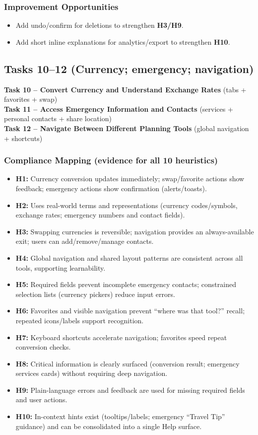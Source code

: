 \documentclass[11pt,a4paper]{article}
\begin{document}
\subsubsection{Improvement Opportunities}
\begin{itemize}
    \item Add undo/confirm for deletions to strengthen \textbf{H3/H9}.
    \item Add short inline explanations for analytics/export to strengthen \textbf{H10}.
\end{itemize}

\subsection{Tasks 10--12 (Currency; emergency; navigation)}
\textbf{Task 10 – Convert Currency and Understand Exchange Rates} (tabs + favorites + swap)\\
\textbf{Task 11 – Access Emergency Information and Contacts} (services + personal contacts + share location)\\
\textbf{Task 12 – Navigate Between Different Planning Tools} (global navigation + shortcuts)

\subsubsection{Compliance Mapping (evidence for all 10 heuristics)}
\begin{itemize}
    \item \textbf{H1:} Currency conversion updates immediately; swap/favorite actions show feedback; emergency actions show confirmation (alerts/toasts).
    \item \textbf{H2:} Uses real-world terms and representations (currency codes/symbols, exchange rates; emergency numbers and contact fields).
    \item \textbf{H3:} Swapping currencies is reversible; navigation provides an always-available exit; users can add/remove/manage contacts.
    \item \textbf{H4:} Global navigation and shared layout patterns are consistent across all tools, supporting learnability.
    \item \textbf{H5:} Required fields prevent incomplete emergency contacts; constrained selection lists (currency pickers) reduce input errors.
    \item \textbf{H6:} Favorites and visible navigation prevent ``where was that tool?'' recall; repeated icons/labels support recognition.
    \item \textbf{H7:} Keyboard shortcuts accelerate navigation; favorites speed repeat conversion checks.
    \item \textbf{H8:} Critical information is clearly surfaced (conversion result; emergency services cards) without requiring deep navigation.
    \item \textbf{H9:} Plain-language errors and feedback are used for missing required fields and user actions.
    \item \textbf{H10:} In-context hints exist (tooltips/labels; emergency ``Travel Tip'' guidance) and can be consolidated into a single Help surface.
\end{itemize}
\end{document}
